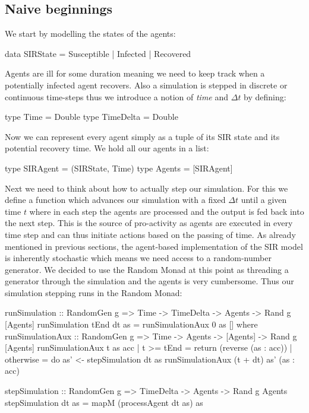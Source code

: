 \subsection{Naive beginnings}
We start by modelling the states of the agents:

\begin{HaskellCode}
data SIRState = Susceptible | Infected | Recovered
\end{HaskellCode}

Agents are ill for some duration meaning we need to keep track when a potentially infected agent recovers. Also a simulation is stepped in discrete or continuous time-steps thus we introduce a notion of \textit{time} and $\Delta t$ by defining:

\begin{HaskellCode}
type Time      = Double
type TimeDelta = Double
\end{HaskellCode}

Now we can represent every agent simply as a tuple of its SIR state and its potential recovery time. We hold all our agents in a list:
\begin{HaskellCode}
type SIRAgent = (SIRState, Time)
type Agents   = [SIRAgent]
\end{HaskellCode}

Next we need to think about how to actually step our simulation. For this we define a function which advances our simulation with a fixed $\Delta t$ until a given time $t$ where in each step the agents are processed and the output is fed back into the next step. This is the source of pro-activity as agents are executed in every time step and can thus initiate actions based on the passing of time.
As already mentioned in previous sections, the agent-based implementation of the SIR model is inherently stochastic which means we need access to a random-number generator. We decided to use the Random Monad at this point as threading a generator through the simulation and the agents is very cumbersome. Thus our simulation stepping runs in the Random Monad:

\begin{HaskellCode}
runSimulation :: RandomGen g => Time -> TimeDelta -> Agents -> Rand g [Agents]
runSimulation tEnd dt as = runSimulationAux 0 as []
  where
    runSimulationAux :: RandomGen g => Time -> Agents -> [Agents] -> Rand g [Agents]
    runSimulationAux t as acc
      | t >= tEnd = return (reverse (as : acc))
      | otherwise = do
        as' <- stepSimulation dt as 
        runSimulationAux (t + dt) as' (as : acc)

stepSimulation :: RandomGen g => TimeDelta -> Agents -> Rand g Agents
stepSimulation dt as = mapM (processAgent dt as) as
\end{HaskellCode}

